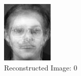 \documentclass[12pt]{article}
\begin{document}
\begin{figure}
	\centering
	\begin{subfigure}[b]{0.20\textwidth}
		\includegraphics[width=\textwidth]{Task4.6_Images/ReconstructedImage0.jpg}
		\caption{Reconstructed Image: 0}
	\end{subfigure}\quad
	\begin{subfigure}[b]{0.20\textwidth}

\end{subfigure}
\end{figure}
\end{document}
